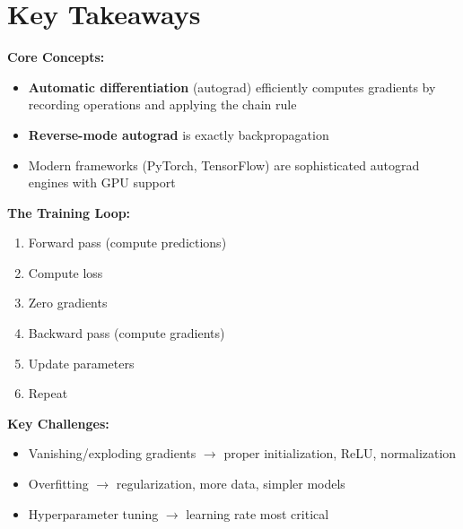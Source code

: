 \section{Key Takeaways}

\begin{summary}
\textbf{Core Concepts:}
\begin{itemize}
    \item \textbf{Automatic differentiation} (autograd) efficiently computes gradients by recording operations and applying the chain rule
    \item \textbf{Reverse-mode autograd} is exactly backpropagation
    \item Modern frameworks (PyTorch, TensorFlow) are sophisticated autograd engines with GPU support
\end{itemize}

\textbf{The Training Loop:}
\begin{enumerate}
    \item Forward pass (compute predictions)
    \item Compute loss
    \item Zero gradients
    \item Backward pass (compute gradients)
    \item Update parameters
    \item Repeat
\end{enumerate}

\textbf{Key Challenges:}
\begin{itemize}
    \item Vanishing/exploding gradients $\rightarrow$ proper initialization, ReLU, normalization
    \item Overfitting $\rightarrow$ regularization, more data, simpler models
    \item Hyperparameter tuning $\rightarrow$ learning rate most critical
\end{itemize}
\end{summary}
